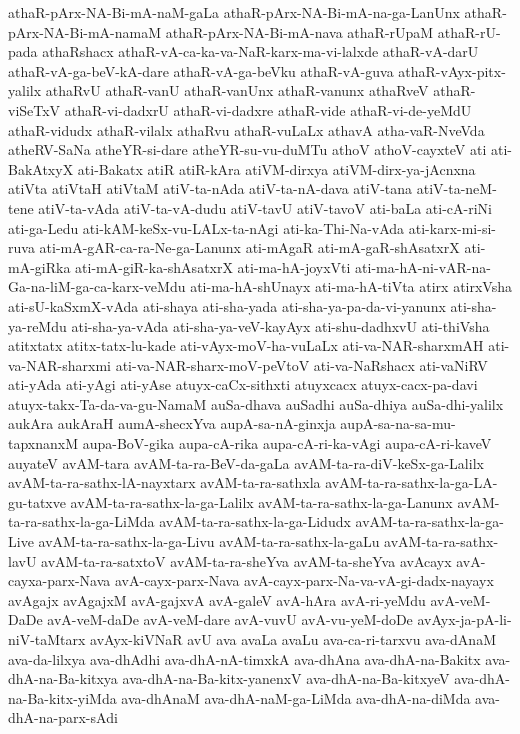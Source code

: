 {athaR-pArx-NA-Bi-mA-naM-gaLa
athaR-pArx-NA-Bi-mA-na-ga-LanUnx
athaR-pArx-NA-Bi-mA-namaM
athaR-pArx-NA-Bi-mA-nava
athaR-rUpaM
athaR-rU-pada
athaRshacx
athaR-vA-ca-ka-va-NaR-karx-ma-vi-lalxde
athaR-vA-darU
athaR-vA-ga-beV-kA-dare
athaR-vA-ga-beVku
athaR-vA-guva
athaR-vAyx-pitx-yalilx
athaRvU
athaR-vanU
athaR-vanUnx
athaR-vanunx
athaRveV
athaR-viSeTxV
athaR-vi-dadxrU
athaR-vi-dadxre
athaR-vide
athaR-vi-de-yeMdU
athaR-vidudx
athaR-vilalx
athaRvu
athaR-vuLaLx
athavA
atha-vaR-NveVda
atheRV-SaNa
atheYR-si-dare
atheYR-su-vu-duMTu
athoV
athoV-cayxteV
ati
ati-BakAtxyX
ati-Bakatx
atiR
atiR-kAra
atiVM-dirxya
atiVM-dirx-ya-jAcnxna
atiVta
atiVtaH
atiVtaM
atiV-ta-nAda
atiV-ta-nA-dava
atiV-tana
atiV-ta-neM-tene
atiV-ta-vAda
atiV-ta-vA-dudu
atiV-tavU
atiV-tavoV
ati-baLa
ati-cA-riNi
ati-ga-Ledu
ati-kAM-keSx-vu-LALx-ta-nAgi
ati-ka-Thi-Na-vAda
ati-karx-mi-si-ruva
ati-mA-gAR-ca-ra-Ne-ga-Lanunx
ati-mAgaR
ati-mA-gaR-shAsatxrX
ati-mA-giRka
ati-mA-giR-ka-shAsatxrX
ati-ma-hA-joyxVti
ati-ma-hA-ni-vAR-na-Ga-na-liM-ga-ca-karx-veMdu
ati-ma-hA-shUnayx
ati-ma-hA-tiVta
atirx
atirxVsha
ati-sU-kaSxmX-vAda
ati-shaya
ati-sha-yada
ati-sha-ya-pa-da-vi-yanunx
ati-sha-ya-reMdu
ati-sha-ya-vAda
ati-sha-ya-veV-kayAyx
ati-shu-dadhxvU
ati-thiVsha
atitxtatx
atitx-tatx-lu-kade
ati-vAyx-moV-ha-vuLaLx
ati-va-NAR-sharxmAH
ati-va-NAR-sharxmi
ati-va-NAR-sharx-moV-peVtoV
ati-va-NaRshacx
ati-vaNiRV
ati-yAda
ati-yAgi
ati-yAse
atuyx-caCx-sithxti
atuyxcacx
atuyx-cacx-pa-davi
atuyx-takx-Ta-da-va-gu-NamaM
auSa-dhava
auSadhi
auSa-dhiya
auSa-dhi-yalilx
aukAra
aukAraH
aumA-shecxYva
aupA-sa-nA-ginxja
aupA-sa-na-sa-mu-tapxnanxM
aupa-BoV-gika
aupa-cA-rika
aupa-cA-ri-ka-vAgi
aupa-cA-ri-kaveV
auyateV
avAM-tara
avAM-ta-ra-BeV-da-gaLa
avAM-ta-ra-diV-keSx-ga-Lalilx
avAM-ta-ra-sathx-lA-nayxtarx
avAM-ta-ra-sathxla
avAM-ta-ra-sathx-la-ga-LA-gu-tatxve
avAM-ta-ra-sathx-la-ga-Lalilx
avAM-ta-ra-sathx-la-ga-Lanunx
avAM-ta-ra-sathx-la-ga-LiMda
avAM-ta-ra-sathx-la-ga-Lidudx
avAM-ta-ra-sathx-la-ga-Live
avAM-ta-ra-sathx-la-ga-Livu
avAM-ta-ra-sathx-la-gaLu
avAM-ta-ra-sathx-lavU
avAM-ta-ra-satxtoV
avAM-ta-ra-sheYva
avAM-ta-sheYva
avAcayx
avA-cayxa-parx-Nava
avA-cayx-parx-Nava
avA-cayx-parx-Na-va-vA-gi-dadx-nayayx
avAgajx
avAgajxM
avA-gajxvA
avA-galeV
avA-hAra
avA-ri-yeMdu
avA-veM-DaDe
avA-veM-daDe
avA-veM-dare
avA-vuvU
avA-vu-yeM-doDe
avAyx-ja-pA-li-niV-taMtarx
avAyx-kiVNaR
avU
ava
avaLa
avaLu
ava-ca-ri-tarxvu
ava-dAnaM
ava-da-lilxya
ava-dhAdhi
ava-dhA-nA-timxkA
ava-dhAna
ava-dhA-na-Bakitx
ava-dhA-na-Ba-kitxya
ava-dhA-na-Ba-kitx-yanenxV
ava-dhA-na-Ba-kitxyeV
ava-dhA-na-Ba-kitx-yiMda
ava-dhAnaM
ava-dhA-naM-ga-LiMda
ava-dhA-na-diMda
ava-dhA-na-parx-sAdi
}
